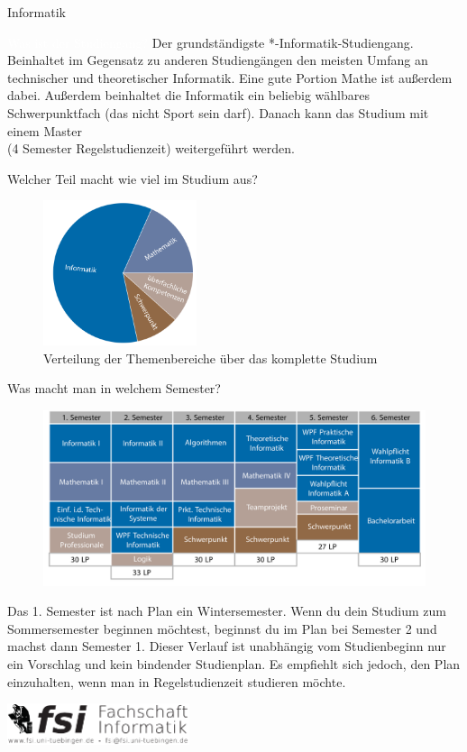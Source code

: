 	\begin{Huge}
			Informatik
		\end{Huge}
		\begin{exampleblock}{\textcolor{white}{Was ist der Studiengang?}}
			Der grundständigste *-Informatik-Studiengang. Beinhaltet im Gegensatz zu anderen Studiengängen den meisten Umfang an technischer und theoretischer Informatik. Eine gute Portion Mathe ist außerdem dabei. Außerdem beinhaltet die Informatik ein beliebig wählbares Schwerpunktfach (das nicht Sport sein darf). Danach kann das Studium mit einem Master \\ (4 Semester Regelstudienzeit) weitergeführt werden.
		\end{exampleblock}
	\begin{block}{Welcher Teil macht wie viel im Studium aus?}
		\begin{figure}[h!]
			\includegraphics[width=0.4\textwidth]{charts/informatik-Piechart.pdf}
			\caption{Verteilung der Themenbereiche über das komplette Studium}
		\end{figure}
	\end{block}
	\begin{block}{Was macht man in welchem Semester?}
		\begin{figure}[h!]
			\includegraphics[width=\textwidth]{charts/informatik-Studienplan_abWS18.pdf}
		\end{figure}
		Das 1. Semester ist nach Plan ein Wintersemester. Wenn du dein Studium zum Sommersemester beginnen möchtest, beginnst du im Plan bei Semester 2 und machst dann Semester 1. 
		Dieser Verlauf ist unabhängig vom Studienbeginn nur ein Vorschlag und kein bindender Studienplan. Es empfiehlt sich jedoch, den Plan einzuhalten, wenn man in Regelstudienzeit studieren möchte.
	\end{block}
\vfill
\begin{flushright}
	\includegraphics[width=0.4\textwidth]{fsilogo.pdf}
\end{flushright}
